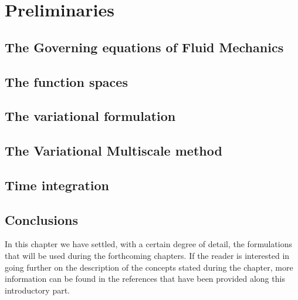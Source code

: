 
\chapter{Preliminaries}
\label{chap-Preliminaries}


\newcommand{\keyword}[1]{\textbf{#1}}
\newcommand{\tabhead}[1]{\textbf{#1}}
\newcommand{\code}[1]{\texttt{#1}}
\newcommand{\file}[1]{\texttt{\bfseries#1}}
\newcommand{\option}[1]{\texttt{\itshape#1}}


\section{The Governing equations of Fluid Mechanics}
\label{sec-C2_gov_eq}


\section{The function spaces}
\label{sec-C2_functional_spaces}


\section{The variational formulation}
\label{sec-C2_variational}


\section{The Variational Multiscale method}
\label{sec-C2_vms}


\section{Time integration}
\label{sec-C2_time_integration}


\section{Conclusions}
\label{sec-C2_conclusions}
In this chapter we have settled, with a certain degree of detail, the formulations that will be used during the forthcoming chapters. If the reader is interested in going further on the description of the concepts stated during the chapter, more information can be found in the references that have been provided along this introductory part.

